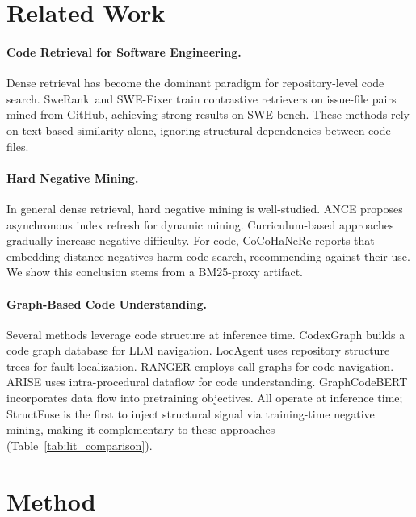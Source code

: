\documentclass[11pt]{article}
\begin{document}
\section{Related Work}
\label{sec:related}

\paragraph{Code Retrieval for Software Engineering.}
Dense retrieval has become the dominant paradigm for repository-level code search.
SweRank~and SWE-Fixer train contrastive retrievers on issue-file pairs mined from GitHub, achieving strong results on SWE-bench.
These methods rely on text-based similarity alone, ignoring structural dependencies between code files.

\paragraph{Hard Negative Mining.}
In general dense retrieval, hard negative mining is well-studied.
ANCE proposes asynchronous index refresh for dynamic mining.
Curriculum-based approaches gradually increase negative difficulty.
For code, CoCoHaNeRe reports that embedding-distance negatives harm code search, recommending against their use.
We show this conclusion stems from a BM25-proxy artifact.

\paragraph{Graph-Based Code Understanding.}
Several methods leverage code structure at inference time.
CodexGraph builds a code graph database for LLM navigation.
LocAgent uses repository structure trees for fault localization.
RANGER employs call graphs for code navigation.
ARISE uses intra-procedural dataflow for code understanding.
GraphCodeBERT incorporates data flow into pretraining objectives.
All operate at inference time; StructFuse is the first to inject structural signal via training-time negative mining, making it complementary to these approaches (Table~\ref{tab:lit_comparison}).

\section{Method}
\label{sec:method}
\end{document}
